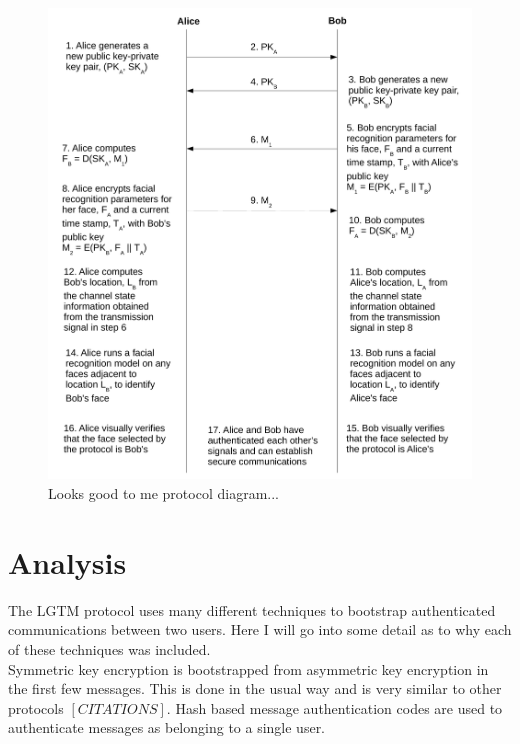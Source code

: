 \documentclass[12pt]{report}
\begin{document}
\begin{figure}
\center
\includegraphics[scale=0.6]{../figures/looks-good-to-me-protocol-diagram--no-legend.pdf}
\caption{Looks good to me protocol diagram...}
\label{protocol-diagram}
\end{figure}


\section{Analysis}
The LGTM protocol uses many different techniques to bootstrap authenticated communications between two users. Here I will go into some detail as to why each of these techniques was included. \\

Symmetric key encryption is bootstrapped from asymmetric key encryption in the first few messages. This is done in the usual way and is very similar to other protocols $[CITATIONS]$. Hash based message authentication codes are used to authenticate messages as belonging to a single user. \\
\end{document}
